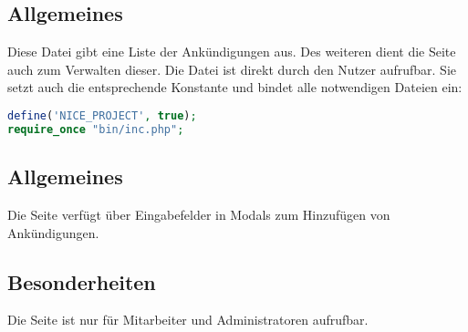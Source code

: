 \subsection{Allgemeines} Diese Datei gibt eine Liste der Ankündigungen aus. Des weiteren dient die Seite auch zum Verwalten dieser.
Die Datei ist direkt durch den Nutzer aufrufbar. Sie setzt auch die entsprechende Konstante und bindet alle notwendigen Dateien ein:
\begin{lstlisting}[language=php]
define('NICE_PROJECT', true);
require_once "bin/inc.php";
\end{lstlisting}
\subsection{Allgemeines}
Die Seite verfügt über Eingabefelder in Modals zum Hinzufügen von Ankündigungen.
\subsection{Besonderheiten}
Die Seite ist nur für Mitarbeiter und Administratoren aufrufbar.